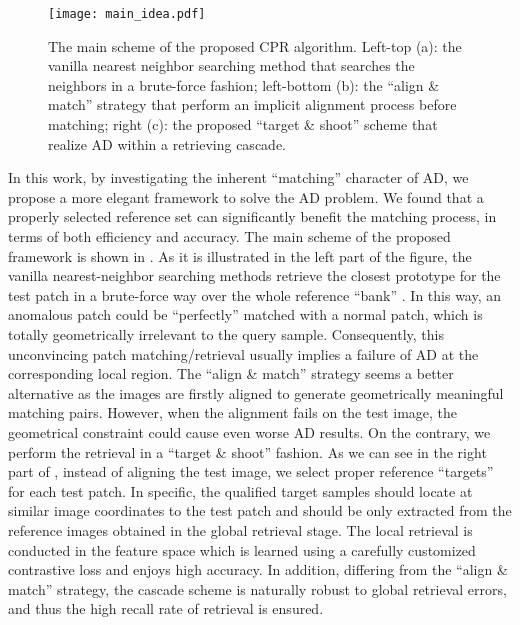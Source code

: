 \documentclass[lettersize,journal]{IEEEtran}
\begin{document}
\begin{figure*}[t!]
  \begin{center}
    \texttt{[image: main\_idea.pdf]}
    \caption{The main scheme of the proposed CPR algorithm. Left-top (a): the vanilla nearest
      neighbor searching method that searches the neighbors in a brute-force fashion;
      left-bottom (b): the ``align \& match'' strategy that perform an implicit alignment
      process before matching; right (c): the proposed ``target \& shoot'' scheme that realize
      AD within a retrieving cascade.}
    \label{fig:main_idea}
  \end{center}
\end{figure*}

In this work, by investigating the inherent ``matching'' character of AD, we propose a
more elegant framework to solve the AD problem. We found that a properly selected
reference set can significantly benefit the matching process, in terms of both
efficiency and accuracy. The main scheme of the proposed framework is shown in
. As it is illustrated in the left part of the figure, the
vanilla nearest-neighbor searching methods retrieve the closest prototype for the test
patch in a brute-force way over the whole reference ``bank'' \cite{roth2022towards,
  kim2022fapm, bae2022image, xie2023pushing, saiku2022enhancing, zhu2022anomaly}. In this
way, an anomalous patch could be ``perfectly'' matched with a normal patch, which is
totally geometrically irrelevant to the query sample. Consequently, this unconvincing
patch matching/retrieval usually implies a failure of AD at the corresponding local
region.
The ``align \& match'' strategy \cite{huang2022registration, zheng2022focus,
  liu2023diversity} seems a better alternative as the images are firstly aligned to
generate geometrically meaningful matching pairs. However, when the alignment fails on
the test image, the geometrical constraint could cause even worse AD results.
On the contrary, we perform the retrieval in a ``target \& shoot'' fashion. As we can
see in the right part of , instead of aligning the test image, we
select proper reference ``targets'' for each test patch. In specific, the qualified target samples should locate at similar image coordinates to the test patch and should be only extracted from the
reference images obtained in the global retrieval stage. The local retrieval is conducted in the feature space which is learned
using a carefully customized contrastive loss and enjoys high accuracy. In addition,
differing from the ``align \& match'' strategy, the cascade scheme is naturally
robust to global retrieval errors, and thus the high recall rate of retrieval is ensured.
\end{document}
